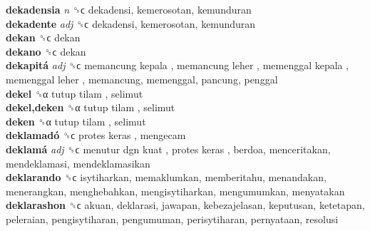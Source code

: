 \textbf{dekadensia} \emph{n}  ␝ϲ  dekadensi, kemerosotan, kemunduran  \\
\textbf{dekadente} \emph{adj}  ␝ϲ  dekadensi, kemerosotan, kemunduran  \\
\textbf{dekan} ␝ϲ  dekan  \\
\textbf{dekano} ␝ϲ  dekan  \\
\textbf{dekapitá} \emph{adj}  ␝ϲ   memancung kepala ,  memancung leher ,  memenggal kepala ,  memenggal leher , memancung, memenggal, pancung, penggal  \\
\textbf{dekel} ␝α   tutup tilam , selimut  \\
\textbf{dekel,deken} ␝α   tutup tilam , selimut  \\
\textbf{deken} ␝α   tutup tilam , selimut  \\
\textbf{deklamadó} ␝ϲ   protes keras , mengecam  \\
\textbf{deklamá} \emph{adj}  ␝ϲ   menutur dgn kuat ,  protes keras , berdoa, menceritakan, mendeklamasi, mendeklamasikan  \\
\textbf{deklarando} ␝ϲ  isytiharkan, memaklumkan, memberitahu, menandakan, menerangkan, menghebahkan, mengisytiharkan, mengumumkan, menyatakan  \\
\textbf{deklarashon} ␝ϲ  akuan, deklarasi, jawapan, kebezajelasan, keputusan, ketetapan, peleraian, pengisytiharan, pengumuman, perisytiharan, pernyataan, resolusi  \\
